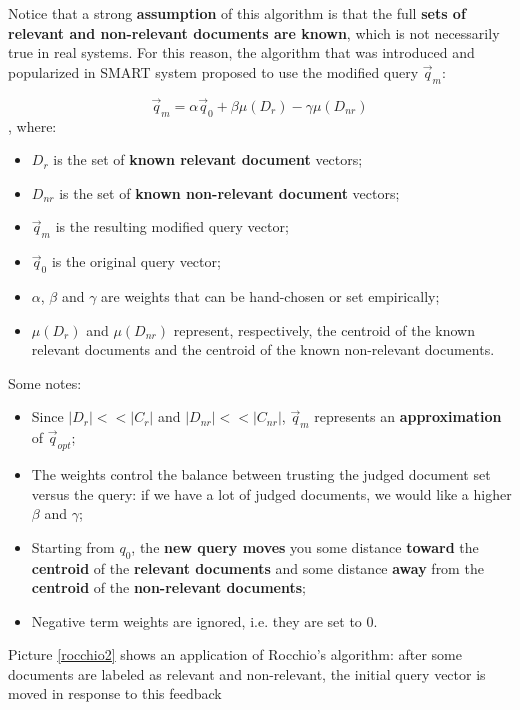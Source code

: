 Notice that a strong \textbf{assumption} of this algorithm is that the full \textbf{sets of relevant and non-relevant documents are known}, which is not necessarily true in real systems. For this reason, the algorithm that was introduced and popularized in SMART system proposed to use the modified query $\Vec{q}_m$:

$$
\Vec{q}_m = \alpha \Vec{q}_0 + \beta \mu (D_r) - \gamma \mu (D_{nr})
$$
, where:

\begin{itemize}
    \item $D_r$ is the set of \textbf{known relevant document} vectors;
    \item $D_{nr}$ is the set of \textbf{known non-relevant document} vectors;
    \item $\Vec{q}_m$ is the resulting modified query vector;
    \item $\Vec{q}_0$ is the original query vector;
    \item $\alpha$, $\beta$ and $\gamma$ are weights that can be hand-chosen or set empirically;
    \item $\mu (D_r)$ and $\mu (D_{nr})$ represent, respectively, the centroid of the known relevant documents and the centroid of the known non-relevant documents.
\end{itemize}

Some notes:

\begin{itemize}
    \item Since $|D_r| << |C_r|$ and $|D_{nr}| << |C_{nr}|$, $\Vec{q}_m$ represents an \textbf{approximation} of $\Vec{q}_{opt}$;
    \item The weights control the balance between trusting the judged document set versus the query: if we have a lot of judged documents, we would like a higher $\beta$ and $\gamma$;
    \item Starting from $q_0$, the \textbf{new query moves} you some distance \textbf{toward} the \textbf{centroid} of the \textbf{relevant documents} and some distance \textbf{away} from the \textbf{centroid} of the \textbf{non-relevant documents};
    \item Negative term weights are ignored, i.e. they are set to 0.
\end{itemize}

Picture \ref{rocchio2} shows an application of Rocchio's algorithm: after some documents are labeled as relevant and non-relevant, the initial query vector is moved in response to this feedback

